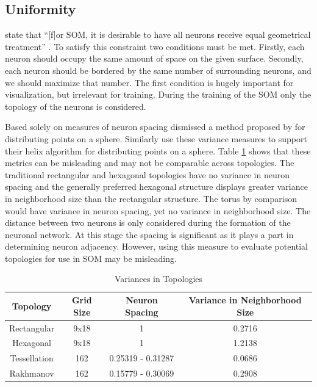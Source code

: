 \documentclass[10pt,titlepage]{article}
\begin{document}
\subsection{Uniformity}
\citeauthor{wu2006} state that ``[f]or SOM, it is desirable to have all neurons
receive equal geometrical treatment'' \cite[pp. 900]{wu2006}.  To satisfy this
constraint two conditions must be met.  Firstly, each neuron should occupy the
same amount of space on the given surface.  Secondly, each neuron should be
bordered by the same number of surrounding neurons, and we should maximize that
number.  The first condition is hugely important for visualization, but
irrelevant for training.  During the training of the SOM only the topology of
the neurons is considered.

Based solely on measures of neuron spacing \cite{wu2005} dismissed a method
proposed by \cite{Rakhmanov94} for distributing points on a sphere.  Similarly
\cite{Nishio:2006fk} use these variance measures to support their helix
algorithm for distributing points on a sphere.  Table \ref{table1} shows that
these metrics can be misleading and may not be comparable across topologies.
The traditional rectangular and hexagonal topologies have no variance in neuron
spacing and the generally preferred hexagonal structure displays greater
variance in neighborhood size than the rectangular structure.  The torus by
comparison would have variance in neuron spacing, yet no variance in
neighborhood size.  The distance between two neurons is only considered during
the formation of the neuronal network.  At this stage the spacing is significant
as it plays a part in determining neuron adjacency. However, using this measure
to evaluate potential topologies for use in SOM may be misleading.

\begin{table}[htbp]
\caption{Variances in Topologies}
\begin{center}
\begin{tabular}{|c|c|c|c|}
\hline
Topology&Grid Size&Neuron Spacing&Variance in Neighborhood Size\\
\hline
Rectangular&9x18&1&0.2716\\
Hexagonal&9x18&1&1.2138\\
Tessellation&162&0.25319 - 0.31287& 0.0686\\
Rakhmanov&162&0.15779 - 0.30069& 0.2908\\
\hline
\end{tabular}
\end{center}
\label{table1}
\end{table}
\end{document}

